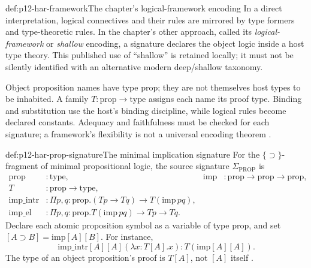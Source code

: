 \begin{hbdefinition}{def:p12-har-framework}{The chapter's logical-framework encoding}
In a direct interpretation, logical connectives and their rules are mirrored
by type formers and type-theoretic rules. In the chapter's other approach,
called its \emph{logical-framework} or \emph{shallow} encoding, a signature
declares the object logic inside a host type theory. This published use of
``shallow'' is retained locally; it must not be silently identified with an
alternative modern deep/shallow taxonomy.

Object proposition names have type \(\mathrm{prop}\); they are not
themselves host types to be inhabited. A family
\(T:\mathrm{prop}\to\mathrm{type}\) assigns each name its proof type.
Binding and substitution use the host's binding discipline, while logical
rules become declared constants. Adequacy and faithfulness must be checked
for each signature; a framework's flexibility is not a universal encoding
theorem \cite[pp.~1160--1163]{BarendregtGeuvers2001}.
\end{hbdefinition}

\begin{hbdefinition}{def:p12-har-prop-signature}{The minimal implication signature}
For the \(\{\supset\}\)-fragment of minimal propositional logic, the
source signature \(\Sigma_{\mathrm{PROP}}\) is
\[
\begin{aligned}
 \mathrm{prop}&:\mathrm{type},&
 \mathrm{imp}&:\mathrm{prop}\to\mathrm{prop}\to\mathrm{prop},\\
 T&:\mathrm{prop}\to\mathrm{type},\\
 \mathrm{imp\_intr}&:\Pi p,q:\mathrm{prop}.(Tp\to Tq)\to T(\mathrm{imp}\,p q),\\
 \mathrm{imp\_el}&:\Pi p,q:\mathrm{prop}.
             T(\mathrm{imp}\,p q)\to Tp\to Tq.
\end{aligned}
\]
Declare each atomic proposition symbol as a variable of type
\(\mathrm{prop}\), and set
\([A\supset B]=\mathrm{imp}[A][B]\). For instance,
\[
 \mathrm{imp\_intr}[A][A](\lambda x:T[A].x)
       :T(\mathrm{imp}[A][A]).
\]
The type of an object proposition's proof is \(T[A]\), not
\([A]\) itself \cite[p.~1161]{BarendregtGeuvers2001}.
\end{hbdefinition}

